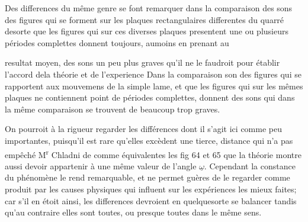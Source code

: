 \documentclass[11pt,a4paper]{article}
\begin{document}
Des differences du même genre se font remarquer dans la
comparaison des sons des figures qui se forment sur les plaques
rectangulaires differentes du quarré desorte que les figures
qui sur ces diverses plaques presentent une ou plusieurs
périodes complettes donnent toujours, aumoins en prenant au


resultat moyen, des sons un peu plus graves qu'il ne le faudroit
pour établir l'accord  dela théorie et de l'experience
Dans la comparaison  son des figures qui se rapportent aux
mouvemens de la simple lame, et que les figures qui sur les
mêmes plaques ne contiennent point de périodes complettes,
donnent des sons qui dans la même comparaison se trouvent
de beaucoup trop graves.

On pourroit à la rigueur regarder les différences dont
il s'agit ici comme peu importantes, puisqu'il est rare qu'elles
excèdent une tierce, distance qui n'a pas empêché
M\textsuperscript{r} Chladni de   comme équivalentes les fig 64 et
65 que la théorie montre aussi devoir appartenir à une
même valeur de l'angle $\underline{\omega}$. Cependant la constance
du phénomène le rend remarquable, et ne permet guères
de le regarder comme produit par les causes physiques
qui influent sur les expériences les mieux faites; car
s'il en étoit ainsi, les differences devroient en quelquesorte
se balancer tandis qu'au contraire elles sont toutes, ou
presque toutes dans le même sens.
\end{document}
